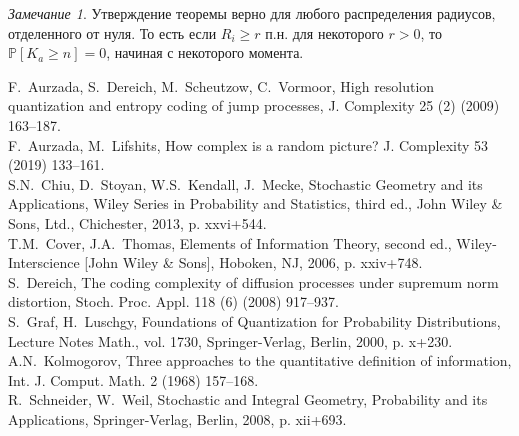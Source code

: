\documentclass[12pt]{article}
\theoremstyle{plain}
\newtheorem{thm}{Теорема} %
\theoremstyle{definition}
\theoremstyle{remark}
\newtheorem*{rem}{Замечание}
\def\geq{\geqslant}
\def\leq{\leqslant}
\newcommand{\PP}{\mathbb{P}}
\begin{document}
\begin{rem}
Утверждение теоремы верно для любого распределения радиусов, отделенного от нуля. То есть если $R_i \geq r$ п.н. для некоторого $r>0$, то $\PP[K_a \geq n] = 0$, начиная с некоторого момента.
\end{rem}






\begin{thebibliography}{99}
{\baselineskip=12pt
F.~Aurzada, S.~Dereich, M.~Scheutzow, C.~Vormoor, High resolution quantization and entropy coding of jump processes, J.
Complexity 25 (2) (2009) 163–187.\\

F.~Aurzada, M.~Lifshits, How complex is a random picture? J. Complexity 53 (2019) 133–161.\\

 S.N.~Chiu, D.~Stoyan, W.S.~Kendall, J.~Mecke, Stochastic Geometry and its Applications, Wiley Series in Probability and
Statistics, third ed., John Wiley \& Sons, Ltd., Chichester, 2013, p. xxvi+544.\\

T.M.~Cover, J.A.~Thomas, Elements of Information Theory, second ed., Wiley-Interscience [John Wiley \& Sons], Hoboken,
NJ, 2006, p. xxiv+748.\\

S.~Dereich, The coding complexity of diffusion processes under supremum norm distortion, Stoch. Proc. Appl. 118
(6) (2008) 917–937.\\

S.~Graf, H.~Luschgy, Foundations of Quantization for Probability Distributions, Lecture Notes Math., vol. 1730,
Springer-Verlag, Berlin, 2000, p. x+230.\\


A.N.~Kolmogorov, Three approaches to the quantitative definition of information, Int. J. Comput. Math. 2 (1968) 157–168.\\




R.~Schneider, W.~Weil, Stochastic and Integral Geometry, Probability and its Applications, Springer-Verlag,
Berlin, 2008, p. xii+693.
}
\end{thebibliography}
\end{document}

